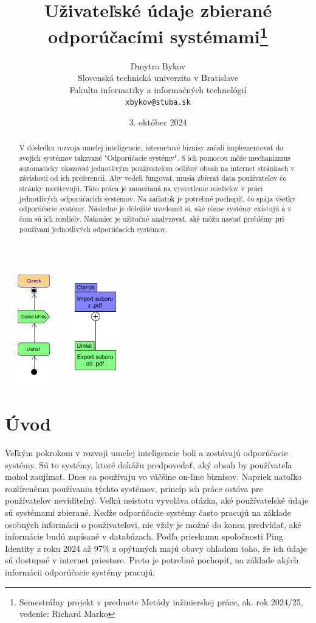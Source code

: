 \documentclass[10pt,twocolumn,twoside,slovak,a4paper]{article}
\title{Uživateľské údaje zbierané odporúčacími systémami\thanks{Semestrálny projekt v predmete Metódy inžinierskej práce, ak. rok 2024/25, vedenie: Richard Marko}} %
\author{Dmytro Bykov\\[2pt]
	{\small Slovenská technická univerzita v Bratislave}\\
	{\small Fakulta informatiky a informačných technológií}\\
	{\small \texttt{xbykov@stuba.sk}}
	}
\date{\small 3. október 2024} %
\begin{document}
\maketitle

\begin{abstract}
V dôsledku rozvoja umelej inteligencie, internetové biznisy začali implementovať do svojich systémov takzvané "Odporúčacie systémy". S ich pomocou môže mechanizmus automaticky ukazovať jednotlivým použivateľom odlišný obsah na internet stránkach v závislosti od ich preferencii. Aby vedeli fungovať, musia zbierať data použivateľov čo stránky navštevujú. Táto práca je zamerianá na vysvetlenie rozdielov v práci jednotlivých odporúčacich systémov. Na začiatok je potrebné pochopiť, čo spája všetky odporúčacie systémy. Následne je dôležité uvedomiť si, aké rôzne systémy existujú a v čom sú ich rozdiely. Nakoniec je užitočné analyzovať, aké môžu nastať problémy pri používaní jednotlivých odporúčacích systémov.
\end{abstract}

\includegraphics[height =2in,width=1in, angle = 90]{progres_mip.pdf}
\includegraphics[height =2in,width=1in]{diagram_2.pdf}

\section{Úvod}

Veľkým pokrokom v rozvoji umelej inteligencie boli a zostávajú odporúčacie systémy. Sú to systémy, ktoré dokážu predpovedať, aký obsah by používateľa mohol zaujímať. Dnes sa používaju vo väčšine on-line biznisov. Napriek natoľko rozšírenému používaniu týchto systémov, princíp ich práce ostáva pre používateľov neviditeľný. Veľkú neistotu vyvoláva otázka, aké používateľské údaje sú systémami zbierané. Keďže odporúčacie systémy často pracujú na základe osobných informácii o použivateľovi, nie vždy je možné do konca predvídať, aké informácie budú zapísané v databázach. Podľa prieskumu spoločnosti Ping Identity z roku 2024 až 97\% z opýtaných majú obavy ohľadom toho, že ich údaje sú dostupné v internet priestore\cite{Ping:Fear}. Preto je potrebné pochopiť, na základe akých informácii odporúčacie systémy pracujú. 
\end{document}
